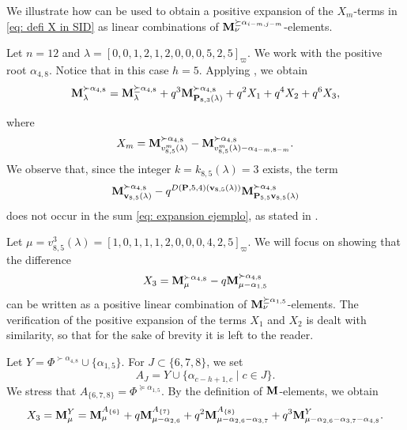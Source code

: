 \begin{example}\rm  \label{ex: como funciona}
    We illustrate how  can be used to obtain a positive expansion of the $X_m$-terms in \eqref{eq: defi X in SID} as linear combinations of $\mathbf{M}^{\succeq \alpha_{i-m,j-m}}_{\nu}$-elements.

    Let $n=12$ and $\lambda =[0,0,1,2,1,2,0,0,0,5,2,5]_{\varpi}$. 
    We work with the positive root $\alpha_{4,8}$. 
    Notice that in this case $h=5$. 
    Applying , we obtain
    \begin{equation} \label{eq: expansion ejemplo}
        \mathbf{M}_{\lambda}^{\succ \alpha_{4,8}} = \mathbf{M}_{\lambda}^{\succeq \alpha_{4,8}}+  q^3\mathbf{M}_{\mathbf{P}_{8,3}(\lambda)}^{\succ \alpha_{4,8}} + q^2X_{1} + q^4X_{2} + q^6X_{3},
    \end{equation}
  
    where 
    \begin{equation}
    X_{m} = \mathbf{M}_{v^{m}_{8,5}(\lambda)}^{\succ \alpha_{4,8}} - \mathbf{M}_{v^{m}_{8,5}(\lambda) - \alpha_{4-m,8-m}}^{\succ \alpha_{4,8}}.
    \end{equation}
    We observe that, since the integer $k = k_{8,5}(\lambda) = 3$ exists, the term $$\mathbf{M}_{\mathbf{v}_{8,5}(\lambda)}^{\succ \alpha_{4,8}} - q^{D(\mathbf{P},5,4)(\mathbf{v}_{8,5}(\lambda))}\mathbf{M}_{\mathbf{P}_{5,5}\mathbf{v}_{8,5}(\lambda)}^{\succ \alpha_{4,8}}$$ does not occur in the sum \eqref{eq: expansion ejemplo}, as stated in .


    
    Let $\mu = v_{8,5}^3(\lambda) = [1, 0, 1, 1, 1, 2, 0, 0, 0, 4, 2, 5]_{\varpi}$.  
    We will focus on showing that the difference
\begin{equation}
  X_3=  \mathbf{M}_{\mu}^{\succ \alpha_{4,8}} -q\mathbf{M}_{\mu - \alpha_{1,5}}^{\succ \alpha_{4,8}}
\end{equation}
    can be written as a positive linear combination of $\mathbf{M}_{\nu}^{\succeq \alpha_{1,5}}$-elements.
    The verification of the positive expansion of the terms $X_1$ and $X_2$ is dealt with similarity, so that for the sake of brevity it is  left to the reader. 

    

    Let $Y=\Phi^{\succ \alpha_{4,8}} \cup \{\alpha_{1,5}\}$. 
    For $J\subset \{6,7,8\}$, we set
    \[
        A_{J}=Y \cup \{\alpha_{c-h+1,c} \mid c \in J\}.
    \]
    We stress that $A_{\{6,7,8\}} = \Phi^{\succeq \alpha_{1,5}}$. 
    By the definition of $\mathbf{M}$-elements, we obtain
    \begin{equation}
       X_3= \mathbf{M}_{\mu}^{Y} = \mathbf{M}_\mu^{A_{\{6\}}} +q\mathbf{M}_{\mu-\alpha_{2,6}}^{A_{\{7\}}}
       +q^{2}\mathbf{M}_{\mu-\alpha_{2,6}-\alpha_{3,7}}^{A_{\{8\}}}
        +q^{3}\mathbf{M}_{\mu-\alpha_{2,6}-\alpha_{3,7}-\alpha_{4,8}}^{Y}.
    \end{equation}
    

\end{example}
